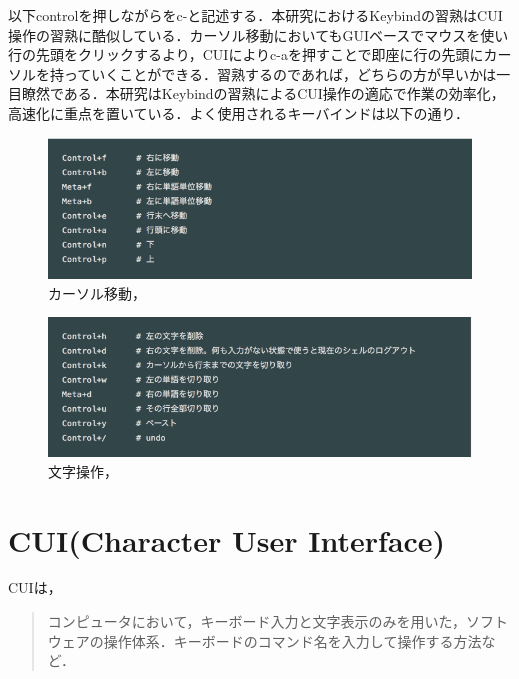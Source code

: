 以下controlを押しながらをc-と記述する．本研究におけるKeybindの習熟はCUI操作の習熟に酷似している．カーソル移動においてもGUIベースでマウスを使い行の先頭をクリックするより，CUIによりc-aを押すことで即座に行の先頭にカーソルを持っていくことができる．習熟するのであれば，どちらの方が早いかは一目瞭然である．本研究はKeybindの習熟によるCUI操作の適応で作業の効率化，高速化に重点を置いている．よく使用されるキーバインドは以下の通り．
\begin{figure}[H]
\centering
\begin{center}
\includegraphics[width=150mm]{../../picture/keybind1.png}
\end{center}
\caption{カーソル移動，\label{sample}}
\end{figure}

\begin{figure}[H]
\centering
\begin{center}
\includegraphics[width=150mm]{../../picture/keybind2.png}
\end{center}
\caption{文字操作，\label{sample}}
\end{figure}

    \section{CUI(Character User
Interface)}\label{cuicharacter-user-interface}

CUIは，
\begin{quotation}
コンピュータにおいて，キーボード入力と文字表示のみを用いた，ソフトウェアの操作体系．キーボードのコマンド名を入力して操作する方法など． \cite{cui}
\end{quotation}

